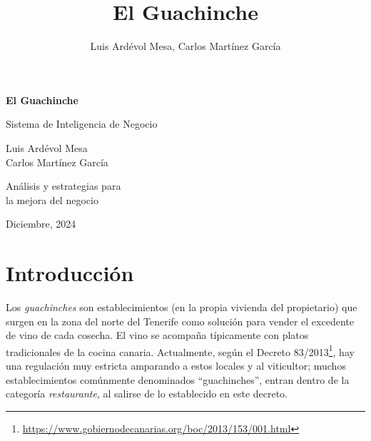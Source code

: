 \documentclass[12pt]{opticajnl}
\title{El Guachinche}
\author[1,2,3]{Luis Ardévol Mesa, Carlos Martínez García}
\begin{document}
\begin{titlepage}
\begin{center}
    \vspace*{5cm}
    
    {\huge\bfseries El Guachinche\par}
    \vspace{1cm}
    
    {\Large\color{crimson} Sistema de Inteligencia de Negocio\par}
    \vspace{1cm}
    
    
    \vspace{1.5cm}
    {\large Luis Ardévol Mesa\\
    Carlos Martínez García\par}
    
    \vfill
    
    {\large Análisis y estrategias para\\
    la mejora del negocio\par}
    
    \vspace{2cm}
    
    {\large Diciembre, 2024\par}
\end{center}
\end{titlepage}

\maketitle

\section{Introducción}


Los \textit{guachinches} son establecimientos (en la propia vivienda del propietario) que surgen en la zona del norte del Tenerife como solución para vender el excedente de vino de cada cosecha. El vino se acompaña típicamente con platos tradicionales de la cocina canaria. Actualmente, según el Decreto 83/2013\footnote{\url{https://www.gobiernodecanarias.org/boc/2013/153/001.html}}, hay una regulación muy estricta amparando a estos locales y al viticultor; muchos establecimientos comúnmente denominados ``guachinches'', entran dentro de la categoría \textit{restaurante}, al salirse de lo establecido en este decreto. \\
\end{document}
